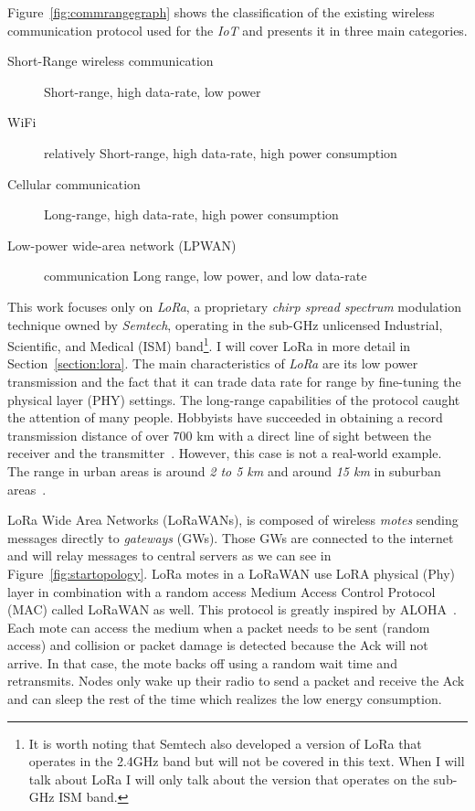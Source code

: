 Figure~\ref{fig:commrangegraph} shows the classification
of the existing wireless communication protocol used for the \emph{IoT} and
presents it in three main categories.

\begin{description}
    \item[Short-Range wireless communication] Short-range, high
        data-rate, low power
    \item[WiFi] relatively Short-range, high
        data-rate, high power consumption
    \item[Cellular communication] Long-range, high data-rate, high power
        consumption
    \item[Low-power wide-area network (LPWAN)] communication Long range,
        low power, and low data-rate
\end{description}



This work focuses only on \emph{LoRa}, a proprietary \emph{chirp spread spectrum}
modulation technique owned by \emph{Semtech}, operating in the sub-GHz
unlicensed Industrial, Scientific, and Medical (ISM) band\footnote{It is worth noting that Semtech also developed a version of LoRa that
operates in the 2.4GHz band but will not be covered in this text. When I will talk
about LoRa I will only talk about the version that operates on the sub-GHz ISM band.}.
I will cover LoRa in more detail in Section~\ref{section:lora}.
The main characteristics of \emph{LoRa} are its low power transmission and the
fact that it can trade data rate for range by fine-tuning the physical layer
(PHY) settings.
The long-range capabilities of the protocol caught the attention of
many people.
Hobbyists have succeeded in obtaining a record transmission distance of over 700 km with
a direct line of sight between the receiver and the
transmitter~\cite{network_2017}.
However, this case is not a real-world example. The range in urban areas is
around \emph{2 to 5 km} and around \emph{15 km} in suburban
areas~\cite{8030482}.

LoRa Wide Area Networks (LoRaWANs),
is composed of wireless \emph{motes} sending messages directly to \emph{gateways} (GWs).
Those GWs are connected to the internet and will relay messages to central servers
as we can see in Figure~\ref{fig:startopology}.
LoRa motes in a LoRaWAN use LoRA physical (Phy) layer in combination with a
random access Medium Access Control Protocol (MAC) called LoRaWAN as well.
This protocol is greatly inspired by ALOHA~\cite{loraalliance:lorawanspecification}.
Each mote can access the medium when a packet needs to be sent (random access)
and collision or packet damage is detected because the Ack will not arrive.
In that case, the mote backs off using a random wait time and retransmits.
Nodes only wake up their radio to send a packet and receive the Ack and can
sleep the rest of the time which realizes the low energy consumption.

